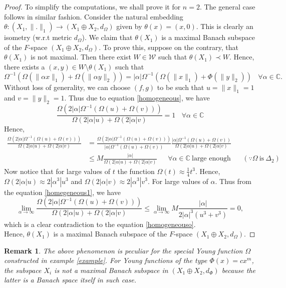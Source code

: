 \documentclass[pdflatex,sn-mathphys-num]{sn-jnl}%
\newtheorem{remark}{Remark}
\theoremstyle{thmstyleone}%
\theoremstyle{thmstyletwo}%
\theoremstyle{thmstylethree}%
\begin{document}
	\begin{proof}
		To simplify the computations, we shall prove it for $n=2$. The general case follows in similar fashion. Consider the natural embedding $\theta:(X_1, \|.\|_1)\to \left(X_1\oplus X_2, d_\Omega\right)$ given by $\theta(x)=(x,0)$. This is clearly an isometry (w.r.t metric $d_\Omega$).  We claim that $\theta(X_1)$ is a maximal Banach subspace of the $F$-space $\left(X_1\oplus X_2,d_\Omega\right)$. To prove this, suppose  on the contrary, that $\theta(X_1)$ is not maximal. Then there exist $W\in \mathcal W$ such that $\theta(X_1)\prec W$. Hence, there exists a $(x,y)\in W\setminus \theta(X_1)$ such that \begin{equation}\label{homogeneous}\Omega^{-1}\left(\Omega(\|\alpha x\|_1)+\Omega(\|\alpha y\|_2)\right)=|\alpha|\Omega^{-1}\left(\Omega(\|x\|_1)+\Phi(\|y\|_2)\right)~~~~\forall \alpha\in \mathbb C.\end{equation}  Without loss of generality, we can choose $(f,g)$ to be such that $u=\|x\|_1= 1$ and $v= \|y\|_2= 1$. Thus due to equation \ref{homogeneous}, we have \begin{equation}\label{homogeneouso}
			\frac{\Omega\left(2|\alpha|\Omega^{-1}(\Omega(u)+\Omega(v))\right)}{	\Omega(2|\alpha| u)+\Omega(2|\alpha| v)}=1~~~~\forall \alpha\in \mathbb C
		\end{equation}
		Hence, 
		\begin{align}\label{homegeneous1}
	\frac{\Omega\left(2|\alpha|\Omega^{-1}(\Omega(u)+\Omega(v))\right)}{	\Omega(2|\alpha| u)+\Omega(2|\alpha| v)}&=	\frac{\Omega\left(2|\alpha|\Omega^{-1}(\Omega(u)+\Omega(v))\right)}{|\alpha|\Omega^{-1}(\Omega(u)+\Omega(v))}\frac{|\alpha|\Omega^{-1}(\Omega(u)+\Omega(v))}{	\Omega(2|\alpha| u)+\Omega(2|\alpha| v)}\nonumber\\
	&\leq M\frac{|\alpha|}{\Omega(2|\alpha| u)+\Omega(2|\alpha| v)}~~~~~~~\forall \alpha\in \mathbb C~\text{large enough}&& (\because \Omega~\text{is}~\Delta_2)
	\end{align}
	Now notice that for large values of $t$ the function $\Omega(t)\approx \frac{1}{4}t^3$. Hence, $\Omega(2|\alpha|u)\approx 2|\alpha^3|u^3$ and $\Omega(2|\alpha|v)\approx 2|\alpha^3|v^3$. For large values of $\alpha$.
	Thus from the equation \ref{homegeneous1}, we have $$\lim_{\alpha\to \infty}\frac{\Omega\left(2|\alpha|\Omega^{-1}(\Omega(u)+\Omega(v))\right)}{	\Omega(2|\alpha| u)+\Omega(2|\alpha| v)}\leq \lim_{\alpha\to \infty}M\frac{|\alpha|}{2|\alpha|^3(u^3+v^3)}=0,$$
	which is a clear contradiction to the equation \ref{homogeneouso}.\\
	
	Hence, $\theta(X_1)$ is a maximal Banach subspace of the $F$-space $(X_1\oplus X_2, d_\Omega)$.
	\end{proof}
	\begin{remark}
		The above phenomenon is peculiar for the special Young function $\Omega$ constructed in example \ref{example}. For Young functions of the type $\Phi(x)=cx^m$, the subspace $X_i$ is not a maximal Banach subspace in $(X_1\oplus X_2,d_\Phi)$ because the latter is a Banach space itself in such case.
	\end{remark}
	
\end{document}
